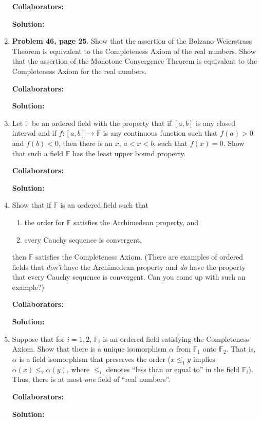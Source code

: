\documentclass{article}%
\begin{document}
\begin{enumerate}
\bigskip
\textbf{Collaborators:}\\
\smallskip
 
\textbf{Solution:}
\bigskip



\item \textbf{Problem 46, page 25}. Show that the assertion of the Bolzano-Weierstrass Theorem is equivalent to the Completeness Axiom of the real numbers.  Show that the assertion of the Monotone Convergence Theorem is equivalent to the Completeness Axiom for the real numbers.


\bigskip
\textbf{Collaborators:}\\
\smallskip
 
\textbf{Solution:}
\bigskip



\item Let $\mathbb{F}$ be an ordered field with the property that if $[a,b]$ is any closed interval and if $f:[a,b]\rightarrow \mathbb{F}$ is any continuous function such that $f(a)>0$ and $f(b)<0$, then there is an $x$, $a < x < b$, such that $f(x)=0$.  Show that such a field $\mathbb{F}$ has the least upper bound property.


\bigskip
\textbf{Collaborators:}\\
\smallskip
 
\textbf{Solution:}
\bigskip


\item Show that if $\mathbb{F}$ is an ordered field such that
\begin{enumerate}
\item the order for $\mathbb{F}$ satisfies the Archimedean property, and
\item every Cauchy sequence is convergent, 
\end{enumerate}
then $\mathbb{F}$ satisfies the Completeness Axiom. (There are examples of ordered fields that \emph{don't} have the Archimedean property and \emph{do} have the property that every Cauchy sequence is convergent.  Can you come up with such an example?)


\bigskip
\textbf{Collaborators:}\\
\smallskip
 
\textbf{Solution:}
\bigskip


\item Suppose that for $i = 1,2$, $\mathbb{F}_i$ is an ordered field satisfying the Completeness Axiom. Show that there is a unique isomorphism $\alpha$ from $\mathbb{F}_1$ onto $\mathbb{F}_2$. That is, $\alpha$ is a field isomorphism that preserves the order ($x \leq_1 y$ implies $\alpha(x) \leq_2 \alpha(y)$, where $\leq_i$ denotes ``less than or equal to'' in the field $\mathbb{F}_i$). Thus, there is at most \emph{one} field of ``real numbers''. 


\bigskip
\textbf{Collaborators:}\\
\smallskip
 
\textbf{Solution:}
\bigskip


\end{enumerate}
\end{document}
